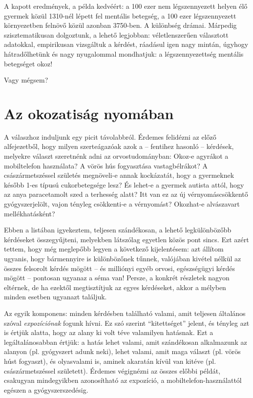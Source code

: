 \documentclass[magyar,]{book}
\begin{document}
A kapott eredmények, a példa kedvéért: a 100 ezer nem légszennyezett helyen élő gyermek közül 1310-nél lépett fel mentális betegség, a 100 ezer légszennyezett környezetben felnövő közül azonban 3750-ben. A különbség drámai. Márpedig szisztematikusan dolgoztunk, a lehető legjobban: véletlenszerűen választott adatokkal, empirikusan vizsgáltuk a kérdést, ráadásul igen nagy mintán, úgyhogy hátradőlhetünk és nagy nyugalommal mondhatjuk: a légszennyezettség mentális betegséget okoz!

Vagy mégsem?

\hypertarget{az-okozatisuxe1g-nyomuxe1ban}{%
\section{Az okozatiság nyomában}\label{az-okozatisuxe1g-nyomuxe1ban}}

A válaszhoz induljunk egy picit távolabbról. Érdemes felidézni az előző alfejezetből, hogy milyen szerteágazóak azok a -- fentihez hasonló -- kérdések, melyekre választ szeretnénk adni az orvostudományban: Okoz-e agyrákot a mobiltelefon használata? A vörös hús fogyasztása vastagbélrákot? A császármetszéssel születés megnöveli-e annak kockázatát, hogy a gyermeknek később 1-es típusú cukorbetegsége lesz? És lehet-e a gyermek autista attól, hogy az anya paracetamolt szed a terhesség alatt? Itt van ez az új vérnyomáscsökkentő gyógyszerjelölt, vajon tényleg csökkenti-e a vérnyomást? Okozhat-e alvászavart mellékhatásként?

Ebben a listában igyekeztem, teljesen szándékosan, a lehető legkülönbözőbb kérdéseket összegyűjteni, melyekben látszólag egyetlen közös pont sincs. Ezt azért tettem, hogy még meglepőbb legyen a következő kijelentésem: azt állítom ugyanis, hogy bármennyire is különbözőnek tűnnek, valójában kivétel nélkül az összes felsorolt kérdés mögött -- és milliónyi egyéb orvosi, egészségügyi kérdés mögött -- pontosan ugyanaz a séma van! Persze, a konkrét részletek nagyon eltérnek, de ha ezektől megtisztítjuk az egyes kérdéseket, akkor a mélyben minden esetben ugyanazt találjuk.

Az egyik komponens: minden kérdésben található valami, amit teljesen általános szóval \emph{expozíciónak} fogunk hívni. Ez szó szerint \enquote{kitettséget} jelent, és tényleg azt is értjük alatta, hogy az alany ki volt téve valamilyen hatásnak. Ezt a legáltalánosabban értjük: a hatás lehet valami, amit szándékosan alkalmazunk az alanyon (pl. gyógyszert adunk neki), lehet valami, amit maga választ (pl. vörös húst fogyaszt), és olyasvalami is, aminek akaratán kívül van kitéve (pl. császármetszéssel született). Érdemes végignézni az összes előbbi példát, csakugyan mindegyikben azonosítható az expozíció, a mobiltelefon-használattól egészen a gyógyszerszedésig.
\end{document}
